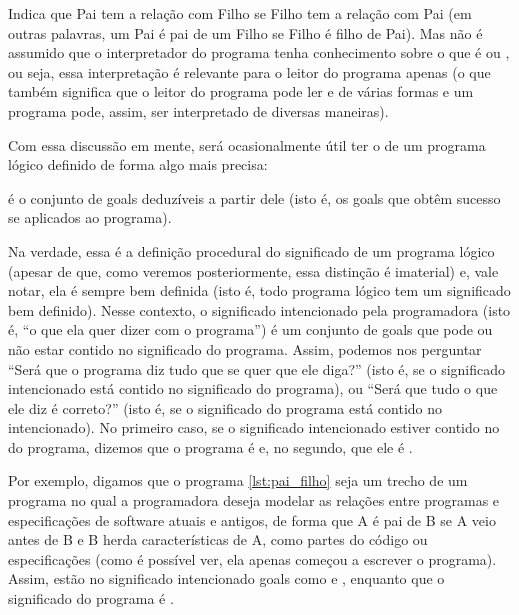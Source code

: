 Indica que Pai tem a relação  com Filho se Filho tem a relação  com Pai (em outras palavras, um Pai é pai de um Filho se Filho é filho de Pai). Mas não é assumido que o interpretador do programa tenha conhecimento sobre o que é  ou , ou seja, essa interpretação é relevante para o leitor do programa apenas (o que também significa que o leitor do programa pode ler  e  de várias formas e um programa pode, assim,
ser interpretado de diversas maneiras).

Com essa discussão em mente, será ocasionalmente útil ter o  de um programa lógico definido de forma algo mais precisa:

  \theoremstyle{definition}
  \begin{definition}  é o conjunto de goals deduzíveis a partir dele (isto é, os goals que obtêm sucesso se aplicados ao programa).
  \end{definition}

  Na verdade, essa é a definição procedural do significado de um programa lógico (apesar de que, como veremos posteriormente, essa distinção é imaterial) e, vale notar, ela é sempre bem definida (isto é, todo programa lógico tem um significado bem definido). Nesse contexto, o significado intencionado pela programadora (isto é, ``o que ela quer dizer com o programa'') é um conjunto de goals que pode ou não estar contido no significado do programa. Assim, podemos nos perguntar ``Será que o
  programa diz tudo que se quer que ele diga?'' (isto é, se o significado intencionado está contido no significado do programa), ou ``Será que tudo o que ele diz é correto?'' (isto é, se o significado do programa está contido no intencionado). No primeiro caso, se o significado intencionado estiver contido no do programa, dizemos que o programa é  e, no segundo, que ele é .

  Por exemplo, digamos que o programa \ref{lst:pai_filho}  seja um trecho de um programa no qual a programadora deseja modelar as relações entre programas e especificações de software atuais e antigos, de forma que A é pai de B se A veio antes de B e B herda características de A, como partes do código ou especificações (como é possível ver, ela apenas começou a escrever o programa). Assim, estão no significado intencionado goals como  e , enquanto que o
  significado do programa é .

